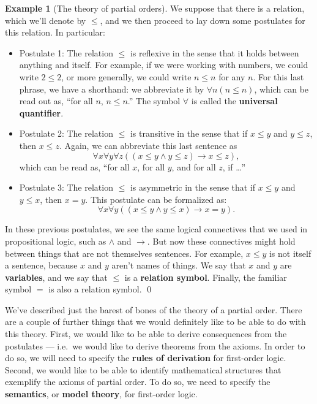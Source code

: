\documentclass[11pt,fleqn]{article}
\theoremstyle{definition}
\newtheorem*{example}{Example}
\theoremstyle{remark}
\newcommand{\2}{\mathscr}
\newcounter{axi}\setcounter{axi}{0}
\begin{document}
\begin{example}[The theory of partial orders] We suppose that there is
  a relation, which we'll denote by $\leq$, and we then proceed to lay
  down some postulates for this relation.  In particular:
\begin{itemize}
\item Postulate 1: The relation $\leq$ is reflexive in the sense that
  it holds between anything and itself.  For example, if we were
  working with numbers, we could write $2\leq 2$, or more generally,
  we could write $n\leq n$ for any $n$.  For this last phrase, we have
  a shorthand: we abbreviate it by $\forall n(n\leq n)$, which can be
  read out as, ``for all $n$, $n\leq n$.''  The symbol $\forall$ is
  called the \textbf{universal quantifier}.
\item Postulate 2: The relation $\leq$  is transitive in the sense
  that if $x\leq y$ and $y\leq z$, then $x\leq z$.  Again, we can
  abbreviate this last sentence as
  \[ \forall x\forall y\forall z((x\leq y\wedge y\leq z)\to x\leq z)
    ,\]
  which can be read as, ``for all $x$, for all $y$, and for all $z$,
  if \dots ''
  \item Postulate 3: The relation $\leq$ is asymmetric in the sense
    that if $x\leq y$ and $y\leq x$, then $x=y$.  This postulate can
    be formalized as:
    \[ \forall x\forall y((x\leq y\wedge y\leq x)\to x=y) .\]
  \end{itemize}
  In these previous postulates, we see the same logical connectives
  that we used in propositional logic, such as $\wedge$ and $\to$.
  But now these connectives might hold between things that are not
  themselves sentences.  For example, $x\leq y$ is not itself a
  sentence, because $x$ and $y$ aren't names of things.  We say that
  $x$ and $y$ are \textbf{variables}, and we say that $\leq$ is a
  \textbf{relation symbol}.  Finally, the familiar symbol $=$ is also
  a relation symbol. \hfill \qed \end{example}

We've described just the barest of bones of the theory of a partial
order.  There are a couple of further things that we would definitely
like to be able to do with this theory.  First, we would like to be
able to derive consequences from the postulates --- i.e.\ we would
like to derive theorems from the axioms.  In order to do so, we will
need to specify the \textbf{rules of derivation} for first-order
logic.  Second, we would like to be able to identify mathematical
structures that exemplify the axioms of partial order.  To do so, we
need to specify the \textbf{semantics}, or \textbf{model theory}, for
first-order logic.
\end{document}
